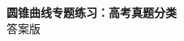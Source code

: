 \documentclass[zihao=-4]{exam-zh}
\begin{document}
\begin{center}
{\bfseries 圆锥曲线专题练习：高考真题分类}\\[4pt]
{ 答案版}
\end{center}

\end{document}
